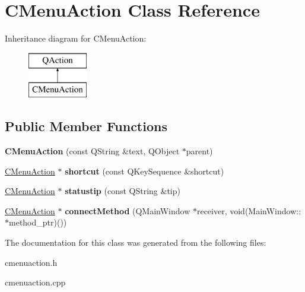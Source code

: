 \hypertarget{class_c_menu_action}{}\section{C\+Menu\+Action Class Reference}
\label{class_c_menu_action}
Inheritance diagram for C\+Menu\+Action\+:\begin{figure}[H]
\begin{center}
\leavevmode
\includegraphics[height=2.000000cm]{class_c_menu_action}
\end{center}
\end{figure}
\subsection*{Public Member Functions}
\begin{DoxyCompactItemize}
\item 
\mbox{\label{class_c_menu_action_a762af602255b6a28009653c22006e92b}} 
{\bfseries C\+Menu\+Action} (const Q\+String \&text, Q\+Object $\ast$parent)
\item 
\mbox{\label{class_c_menu_action_ae4fbb1c435201a660f265ba5e9396866}} 
\hyperlink{class_c_menu_action}{C\+Menu\+Action} $\ast$ {\bfseries shortcut} (const Q\+Key\+Sequence \&shortcut)
\item 
\mbox{\label{class_c_menu_action_a05243dd7fad992e1c6a48a4a16528fa6}} 
\hyperlink{class_c_menu_action}{C\+Menu\+Action} $\ast$ {\bfseries statustip} (const Q\+String \&tip)
\item 
\mbox{\label{class_c_menu_action_a4fafa7b89d31afec68f35e270fc3dd7f}} 
\hyperlink{class_c_menu_action}{C\+Menu\+Action} $\ast$ {\bfseries connect\+Method} (Q\+Main\+Window $\ast$receiver, void(Main\+Window\+::$\ast$method\+\_\+ptr)())
\end{DoxyCompactItemize}


The documentation for this class was generated from the following files\+:\begin{DoxyCompactItemize}
\item 
cmenuaction.\+h\item 
cmenuaction.\+cpp\end{DoxyCompactItemize}
